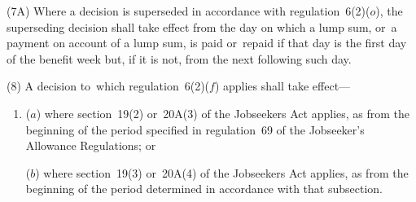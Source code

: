 \documentclass[12pt,a4paper]{article}
\begin{document}
(7A) Where a decision is superseded in accordance with regulation~6(2)($o$), the superseding decision shall take effect from the day on which a lump sum, or~a payment on account of a lump sum, is paid or~repaid if that day is the first day of the benefit week but, if it is not, from the next following such day.

%

(8) A decision to~which regulation~6(2)($f$)  applies shall take effect—
\begin{enumerate}\item[]
($a$) where section~19(2) 
or~20A(3)  %
of the Jobseekers Act applies, as from the beginning of the period specified in regulation~69 of the Jobseeker’s Allowance Regulations; or

($b$) where section~19(3) 
or~20A(4)  %
of the Jobseekers Act applies, as from the beginning of the period determined in accordance with that subsection.
\end{enumerate}
\end{document}
